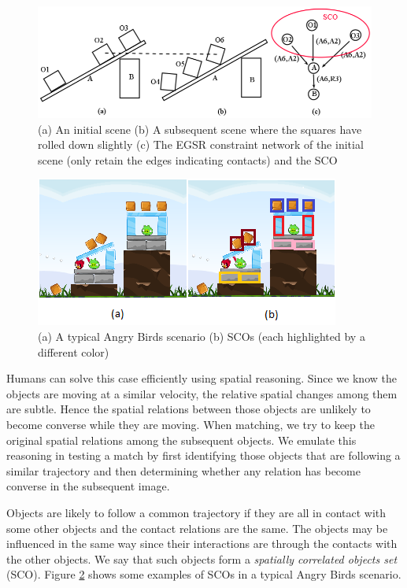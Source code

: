 \documentclass[letterpaper]{article}
\begin{document}
\begin{figure}[b!]
\centering\includegraphics[scale=0.25]{SpatiallyCorrelatdScenario.png}\caption{(a) An initial scene (b) A subsequent scene where the squares have rolled down slightly (c) The EGSR constraint network of the initial scene (only retain the edges indicating contacts) and the SCO}
\label{SCOExample_2}
\end{figure}

\begin{figure}[b!]
\centering\includegraphics[scale=0.55]{SCOScenario.png}\caption{(a) A typical Angry Birds scenario (b) SCOs (each highlighted by a different color)}
\label{SCOExample}
\end{figure}

Humans can solve this case efficiently using spatial reasoning. Since we know the objects are moving at a similar velocity, the relative spatial changes among them are subtle. Hence the spatial relations between those objects are unlikely to become converse while they are moving. When matching, we try to keep the original spatial relations among the subsequent objects. We emulate this reasoning in testing a match by first identifying those objects that are following a similar trajectory and then determining whether any relation has become converse in the subsequent image. 

Objects are likely to follow a common trajectory if they are all in contact with some other objects and the contact relations are the same. The objects may be influenced in the same way since their interactions are through the contacts with the other objects. We say that such objects form a \emph{spatially correlated objects set} (SCO). Figure \ref{SCOExample} shows some examples of SCOs in a typical Angry Birds scenario.
\end{document}
